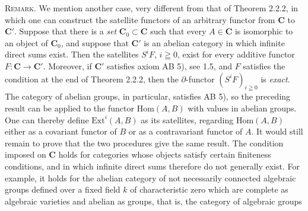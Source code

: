 \indent\textsc{Remark.} We mention another case, very different from that
of Theorem 2.2.2, in which one can construct the satellite functors of an
arbitrary functor from $\mathbf{C}$ to $\mathbf{C}'$. Suppose that there is a \textit{set}
$\mathbf{C}_0\subset \mathbf{C}$ such that every $A\in \mathbf{C}$ is isomorphic to an object of $\mathbf{C}_0$,
and suppose that $\mathbf{C}'$ is an abelian category in which infinite direct sums
exist. Then the satellites $S^iF$, $i\geqq0$, exist for every additive functor
$F:\mathbf{C}\to \mathbf{C}'$. Moreover, if $\mathbf{C}'$ satisfies axiom AB 5), see 1.5,
and $F$ satisfies the condition at the end of Theorem 2.2.2, then the
$\partial$-functor $(S^iF)_{i\geqq0}$ is \textit{exact}. The category of abelian groups,
in particular, satisfies AB 5), so the preceding result can be applied to the
functor $\mathrm{Hom}(A,B)$ with values in abelian groups. One can thereby
define $\mathrm{Ext}^i(A,B)$ as its satellites, regarding
$\mathrm{Hom}(A,B)$ either as a covariant functor of $B$ or as a contravariant
functor of $A$. It would still remain to prove that the two procedures give
the same result. The condition imposed on $\mathbf{C}$ holds for categories whose
objects satisfy certain finiteness conditions, and in which infinite direct
sums therefore do not generally exist. For example, it holds for the
abelian category of not necessarily connected algebraic groups defined over
a fixed field $k$ of characteristic zero which are complete as algebraic
varieties and abelian as groups, that is, the category of algebraic groups

